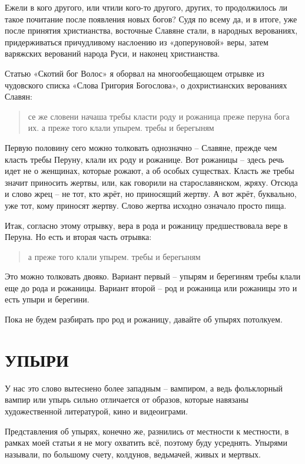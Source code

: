 \documentclass[a5paper,11pt,openany]{article}
\begin{document}
Ежели в кого другого, или чтили кого-то другого, других, то продолжилось ли такое почитание после появления новых богов? Судя по всему да, и в итоге, уже после принятия христианства, восточные Славяне стали, в народных верованиях, придерживаться причудливому наслоению из «доперуновой» веры, затем варяжских верований народа Руси, и наконец христианства.
 
   Статью «Скотий бог Волос»\cite{volos} я оборвал на многообещающем отрывке из чудовского списка «Слова Григория Богослова», о дохристианских верованиях Славян:

\begin{quotation}
\noindent се же словени начаша требы класти роду и рожаница преже перуна бога их. а преже того клали упырем. требы и берегыням
\end{quotation}

   Первую половину сего можно толковать однозначно – Славяне, прежде чем класть требы Перуну, клали их роду и рожанице. Вот рожаницы – здесь речь идет не о женщинах, которые рожают, а об особых существах. Класть же требы значит приносить жертвы, или, как говорили на старославянском, жряху. Отсюда и слово жрец – не тот, кто жрёт, но приносящий жертву. А вот жрёт, буквально, уже тот, кому приносят жертву. Слово жертва исходно означало просто пища.

   Итак, согласно этому отрывку, вера в рода и рожаницу предшествовала вере в Перуна. Но есть и вторая часть отрывка:

\begin{quotation}
\noindent а преже того клали упырем. требы и берегыням
\end{quotation}

   Это можно толковать двояко. Вариант первый – упырям и берегиням требы клали еще до рода и рожаницы. Вариант второй – род и рожаница или рожаницы это и есть упыри и берегини.

   Пока не будем разбирать про род и рожаницу, давайте об упырях потолкуем.

\section{УПЫРИ}
    
   У нас это слово вытеснено более западным – вампиром, а ведь фольклорный вампир или упырь сильно отличается от образов, которые навязаны художественной литературой, кино и видеоиграми. 

   Представления об упырях, конечно же, разнились от местности к местности, в рамках моей статьи я не могу охватить всё, поэтому буду усреднять. Упырями называли, по большому счету, колдунов, ведьмачей, живых и мертвых.
\end{document}
